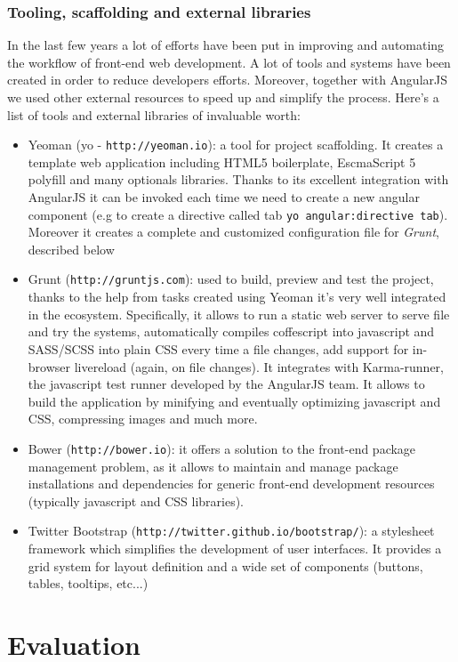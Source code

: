 \documentclass[a4paper,12pt]{report}
\begin{document}
\subsection{Tooling, scaffolding and external libraries}
In the last few years a lot of efforts have been put in improving and automating the workflow of front-end web development. A lot of tools and systems have been created in order to reduce developers efforts. 
Moreover, together with AngularJS we used other external resources to speed up and simplify the process. Here's a list of tools and external libraries of invaluable worth:
\begin{itemize}
\item Yeoman (yo - \texttt{http://yeoman.io}): a tool for project scaffolding. It creates a template web application including HTML5 boilerplate, EscmaScript 5 polyfill and many optionals libraries. Thanks to its excellent integration with AngularJS it can be invoked each time we need to create a new angular component (e.g to create a directive called tab \texttt{yo angular:directive tab}). Moreover it creates a complete and customized configuration file for \emph{Grunt}, described below
\item Grunt (\texttt{http://gruntjs.com}): used to build, preview and test the project, thanks to the help from tasks created using Yeoman it's very well integrated in the ecosystem. Specifically, it allows to run a static web server to serve file and try the systems, automatically compiles coffescript into javascript and SASS/SCSS into plain CSS every time a file changes, add support for in-browser livereload (again, on file changes). It integrates with Karma-runner, the javascript test runner developed by the AngularJS team. It allows to build the application by minifying and eventually optimizing javascript and CSS, compressing images and much more.
\item Bower (\texttt{http://bower.io}): it offers a solution to the front-end package management problem, as it allows to maintain and manage package installations and dependencies for generic front-end development resources (typically javascript and CSS libraries). 
\item Twitter Bootstrap (\texttt{http://twitter.github.io/bootstrap/}): a stylesheet framework which simplifies the development of user interfaces. It provides a grid system for layout definition and a wide set of components (buttons, tables, tooltips, etc...) 
\end{itemize}

\chapter{Evaluation}
\end{document}
